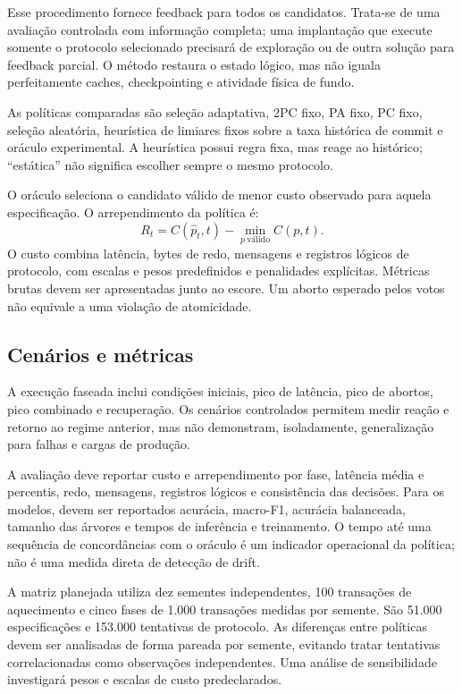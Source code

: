 \documentclass[12pt,a4paper]{article}
\begin{document}
Esse procedimento fornece feedback para todos os candidatos. Trata-se de uma avaliação controlada com informação completa; uma implantação que execute somente o protocolo selecionado precisará de exploração ou de outra solução para feedback parcial. O método restaura o estado lógico, mas não iguala perfeitamente caches, checkpointing e atividade física de fundo.

As políticas comparadas são seleção adaptativa, 2PC fixo, PA fixo, PC fixo, seleção aleatória, heurística de limiares fixos sobre a taxa histórica de commit e oráculo experimental. A heurística possui regra fixa, mas reage ao histórico; ``estática'' não significa escolher sempre o mesmo protocolo.

O oráculo seleciona o candidato válido de menor custo observado para aquela especificação. O arrependimento da política é:
\begin{equation}
R_t=C(\widehat{p}_t,t)-\min_{p\ \mathrm{válido}} C(p,t).
\end{equation}
O custo combina latência, bytes de redo, mensagens e registros lógicos de protocolo, com escalas e pesos predefinidos e penalidades explícitas. Métricas brutas devem ser apresentadas junto ao escore. Um aborto esperado pelos votos não equivale a uma violação de atomicidade.

\subsection{Cenários e métricas}
A execução faseada inclui condições iniciais, pico de latência, pico de abortos, pico combinado e recuperação. Os cenários controlados permitem medir reação e retorno ao regime anterior, mas não demonstram, isoladamente, generalização para falhas e cargas de produção.

A avaliação deve reportar custo e arrependimento por fase, latência média e percentis, redo, mensagens, registros lógicos e consistência das decisões. Para os modelos, devem ser reportados acurácia, macro-F1, acurácia balanceada, tamanho das árvores e tempos de inferência e treinamento. O tempo até uma sequência de concordâncias com o oráculo é um indicador operacional da política; não é uma medida direta de detecção de drift.

A matriz planejada utiliza dez sementes independentes, 100 transações de aquecimento e cinco fases de 1.000 transações medidas por semente. São 51.000 especificações e 153.000 tentativas de protocolo. As diferenças entre políticas devem ser analisadas de forma pareada por semente, evitando tratar tentativas correlacionadas como observações independentes. Uma análise de sensibilidade investigará pesos e escalas de custo predeclarados.
\end{document}
